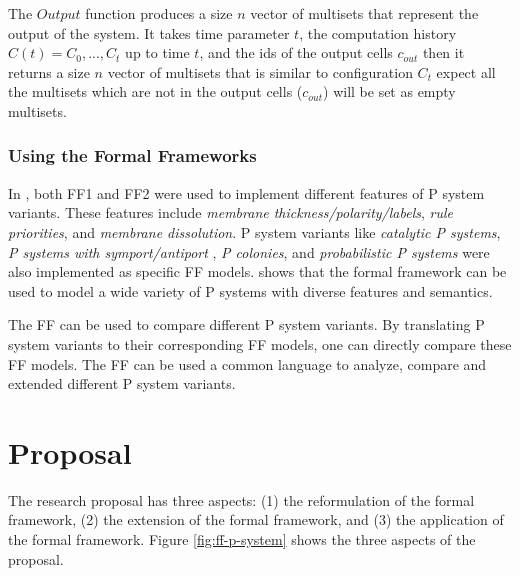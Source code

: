 \documentclass{article}
\begin{document}
The $Output$ function produces a size $n$ vector of multisets that represent the output of the
system. It takes time parameter $t$, the computation history $C(t) = C_0,...,C_t$ up to time $t$, 
and the ids of the output cells $c_{out}$ then it returns a size $n$ vector of multisets that is 
similar to configuration $C_t$ expect all the multisets which are not in the output cells 
($c_{out}$) will be set as empty multisets.


\subsubsection{Using the Formal Frameworks}

In \cite{ff-using}, both FF1 and FF2 were used to implement different features of P system variants.
These features include \emph{membrane thickness/polarity/labels}, \emph{rule priorities}, and
\emph{membrane dissolution}. P system variants like \emph{catalytic P systems}, \emph{P systems with 
symport/antiport} \cite{sym-anti-port}, \emph{P colonies}, and \emph{probabilistic P systems} were 
also implemented as specific FF models. \cite{ff-using} shows that the formal framework can be used 
to model a wide variety of P systems with diverse features and semantics.

The FF can be used to compare different P system variants. By translating P system variants to their
corresponding FF models, one can directly compare these FF models. The FF can be used a common 
language to analyze, compare and extended different P system variants.


\section{Proposal}\label{s-prop}

The research proposal has three aspects: (1) the reformulation of the formal framework, (2) the 
extension of the formal framework, and (3) the application of the formal framework. Figure 
\ref{fig:ff-p-system} shows the three aspects of the proposal.  
\end{document}
